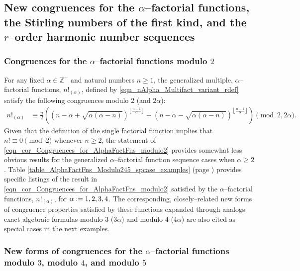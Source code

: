\documentclass[12pt,reqno]{article}
\numberwithin{sfootnote}{section}
\newcommand{\tableref}[1]{Table \ref{#1} (page \pageref{#1})}
\numberwithin{equation}{section}
\theoremstyle{plain}
\theoremstyle{definition}
\theoremstyle{remark}
\newcommand{\defequals}{\ensuremath{\vcentcolon=}}
\newcommand{\MultiFactorial}[2]{\ensuremath{#1!_{\left(#2\right)}}}
\begin{document}
\subsection{New congruences for the 
            $\alpha$--factorial functions, the 
            Stirling numbers of the first kind, and the 
            $r$--order harmonic number sequences} 
\label{subsubSection_Examples_NewCongruences} 

\subsubsection{Congruences for the $\alpha$--factorial functions modulo $2$} 

For any fixed $\alpha \in \mathbb{Z}^{+}$ and natural numbers $n \geq 1$, the 
generalized multiple, $\alpha$--factorial functions, $n!_{(\alpha)}$, 
defined by \eqref{eqn_nAlpha_Multifact_variant_rdef} 
satisfy the following congruences 
modulo $2$ (and $2\alpha$): 
\begin{align} 
\label{eqn_cor_Congruences_for_AlphaFactFns_modulo2} 
n!_{(\alpha)} & \equiv 
     \frac{n}{2} \left(\left(n-\alpha + \sqrt{\alpha 
     (\alpha -n)}\right)^{\left\lfloor \frac{n-1}{\alpha }\right\rfloor } + 
     \left(n-\alpha - \sqrt{\alpha (\alpha -n)}\right)^{\left\lfloor 
     \frac{n-1}{\alpha }\right\rfloor }\right) \pmod{2, 2\alpha}. 
\end{align} 
Given that the definition of the single factorial function implies that 
$n! \equiv 0 \pmod{2}$ whenever $n \geq 2$, the statement of 
\eqref{eqn_cor_Congruences_for_AlphaFactFns_modulo2} 
provides somewhat less obvious results for the 
generalized $\alpha$--factorial function sequence cases when $\alpha \geq 2$. 
\tableref{table_AlphaFactFns_Modulo245_spcase_examples} 
provides specific listings of the result in 
\eqref{eqn_cor_Congruences_for_AlphaFactFns_modulo2} satisfied by the 
$\alpha$--factorial functions, $\MultiFactorial{n}{\alpha}$, 
for $\alpha \defequals 1, 2, 3, 4$. 
The corresponding, closely--related new forms of 
congruence properties satisfied by 
these functions expanded through analogs exact algebraic formulas 
modulo $3$ ($3\alpha$) and modulo $4$ ($4\alpha$) are also cited 
as special cases in the next examples. 

\subsubsection{New forms of congruences for the $\alpha$--factorial functions 
               modulo $3$, modulo $4$, and modulo $5$} 
\end{document}
